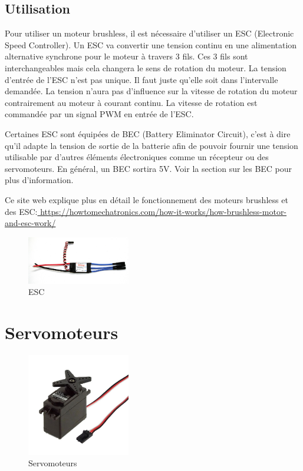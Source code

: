 \documentclass[a4paper, 11pt]{report}
\begin{document}
\subsection{Utilisation}
Pour utiliser un moteur brushless, il est nécessaire d'utiliser un  ESC (Electronic Speed Controller). Un ESC va convertir une tension continu en une alimentation alternative synchrone pour le moteur à travers 3 fils. Ces 3 fils sont interchangeables mais cela changera le sens de rotation du moteur. La tension d'entrée de l'ESC n'est pas unique. Il faut juste qu'elle soit dans l'intervalle demandée. La tension n'aura pas d'influence sur la vitesse de rotation du moteur contrairement au moteur à courant continu. La vitesse de rotation est commandée par un signal PWM en entrée de l'ESC.

Certaines ESC sont équipées de BEC (Battery Eliminator Circuit), c'est à dire qu'il adapte la tension de sortie de la batterie afin de pouvoir fournir une tension utilisable par d'autres éléments électroniques comme un récepteur ou des servomoteurs. En général, un BEC sortira 5V. Voir la section sur les BEC pour plus d'information.

Ce site web explique plus en détail le fonctionnement des moteurs brushless et des ESC:\url{ https://howtomechatronics.com/how-it-works/how-brushless-motor-and-esc-work/}

\begin{figure}[h!]
\begin{centering}
\includegraphics[width=0.4\textwidth]{images/ESC.jpg}
\caption{ESC}
\par\end{centering}
\end{figure}

\section{Servomoteurs}

\begin{figure}[h!]
\begin{centering}
\includegraphics[width=0.4\textwidth]{images/servomoteur.jpg}
\caption{Servomoteurs}
\par\end{centering}
\end{figure}
\end{document}
